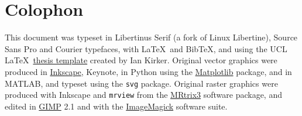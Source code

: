 \documentclass[12pt,phd,a4paper,twoside]{ucl_thesis}
\begin{document}
\chapter*{Colophon}

This document was typeset in Libertinus Serif (a fork of Linux Libertine), {\sffamily Source Sans Pro} and {\ttfamily Courier} typefaces, with \LaTeX\ and Bib\TeX, and using the UCL \LaTeX\ \href{https://github.com/UCL/ucl-latex-thesis-templates}{thesis template} created by Ian Kirker.
Original vector graphics were produced in \href{https://inkscape.org/}{Inkscape}, Keynote, in Python using the \href{https://matplotlib.org/}{Matplotlib} package, and in MATLAB, and typeset using the \verb|svg| package.
Original raster graphics were produced with Inkscape and \verb|mrview| from the \href{https://www.mrtrix.org/}{MRtrix3} software package, and edited in \href{https://www.gimp.org/}{GIMP} 2.1 and with the \href{https://imagemagick.org/index.php}{ImageMagick} software suite.

\end{document}
